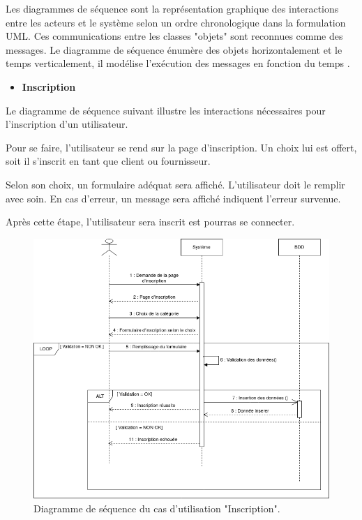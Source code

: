 \documentclass[french]{report}
\begin{document}
Les diagrammes de séquence sont la représentation graphique des interactions entre 
les acteurs et le système selon un ordre chronologique dans la formulation UML.
Ces communications entre les classes "objets" sont reconnues comme des messages.
Le diagramme de séquence énumère des objets horizontalement et le temps verticalement,
il modélise l'exécution des messages en fonction du temps \cite{UML3}.

\begin{itemize}
\item \textbf{Inscription} 
\end{itemize}
	Le diagramme de séquence suivant illustre les interactions nécessaires
	pour l'inscription d'un utilisateur.
	
	Pour se faire, l'utilisateur se rend sur la page d'inscription.
	Un choix lui est offert, soit il s'inscrit en tant que client ou fournisseur.
	
	Selon son choix, un formulaire adéquat sera affiché. 
	L'utilisateur doit le remplir avec soin. En cas d'erreur, un message sera affiché indiquent l'erreur survenue.
	
	Après cette étape, l'utilisateur sera inscrit est pourras se connecter.
	
        \begin{figure}[H]
            \centering
            \includegraphics[width=1\textwidth]{images/Untitled Diagram.drawio.png}
            \caption{Diagramme de séquence du cas d'utilisation "Inscription".}
            \label{fig:my_label}
        \end{figure}
        
\end{document}
